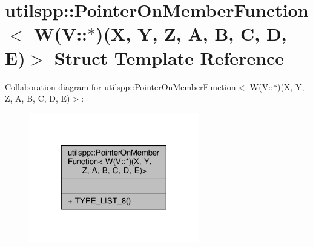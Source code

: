 \hypertarget{structutilspp_1_1PointerOnMemberFunction_3_01W_07V_1_1_5_08_07X_00_01Y_00_01Z_00_01A_00_01B_00_01C_00_01D_00_01E_08_4}{\section{utilspp\-:\-:Pointer\-On\-Member\-Function$<$ W(V\-:\-:$\ast$)(X, Y, Z, A, B, C, D, E)$>$ Struct Template Reference}
\label{structutilspp_1_1PointerOnMemberFunction_3_01W_07V_1_1_5_08_07X_00_01Y_00_01Z_00_01A_00_01B_00_01C_00_01D_00_01E_08_4}
}


Collaboration diagram for utilspp\-:\-:Pointer\-On\-Member\-Function$<$ W(V\-:\-:$\ast$)(X, Y, Z, A, B, C, D, E)$>$\-:
\nopagebreak
\begin{figure}[H]
\begin{center}
\leavevmode
\includegraphics[width=210pt]{structutilspp_1_1PointerOnMemberFunction_3_01W_07V_1_1_5_08_07X_00_01Y_00_01Z_00_01A_00_01B_00_0cde5ceeab476322847955e6c6a9cbaa7}
\end{center}
\end{figure}
